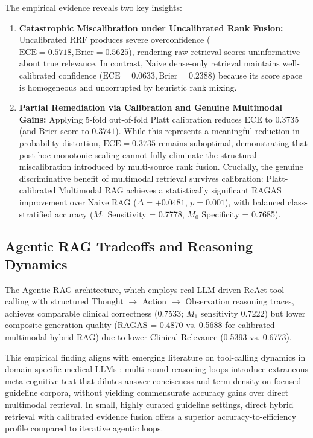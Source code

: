 The empirical evidence reveals two key insights:
\begin{enumerate}
    \item \textbf{Catastrophic Miscalibration under Uncalibrated Rank Fusion:} Uncalibrated RRF produces severe overconfidence ($\text{ECE} = 0.5718, \text{Brier} = 0.5625$), rendering raw retrieval scores uninformative about true relevance. In contrast, Naive dense-only retrieval maintains well-calibrated confidence ($\text{ECE} = 0.0633, \text{Brier} = 0.2388$) because its score space is homogeneous and uncorrupted by heuristic rank mixing.
    \item \textbf{Partial Remediation via Calibration and Genuine Multimodal Gains:} Applying 5-fold out-of-fold Platt calibration reduces ECE to $0.3735$ (and Brier score to $0.3741$). While this represents a meaningful reduction in probability distortion, $\text{ECE} = 0.3735$ remains suboptimal, demonstrating that post-hoc monotonic scaling cannot fully eliminate the structural miscalibration introduced by multi-source rank fusion. Crucially, the genuine discriminative benefit of multimodal retrieval survives calibration: Platt-calibrated Multimodal RAG achieves a statistically significant RAGAS improvement over Naive RAG ($\Delta = +0.0481$, $p = 0.001$), with balanced class-stratified accuracy ($M_1$ Sensitivity = 0.7778, $M_0$ Specificity = 0.7685).
\end{enumerate}

\subsection{Agentic RAG Tradeoffs and Reasoning Dynamics}

The Agentic RAG architecture, which employs real LLM-driven ReAct tool-calling with structured Thought $\to$ Action $\to$ Observation reasoning traces, achieves comparable clinical correctness (0.7533; $M_1$ sensitivity 0.7222) but lower composite generation quality (RAGAS = 0.4870 vs. 0.5688 for calibrated multimodal hybrid RAG) due to lower Clinical Relevance (0.5393 vs. 0.6773). 

This empirical finding aligns with emerging literature on tool-calling dynamics in domain-specific medical LLMs \cite{singh2025agentic}: multi-round reasoning loops introduce extraneous meta-cognitive text that dilutes answer conciseness and term density on focused guideline corpora, without yielding commensurate accuracy gains over direct multimodal retrieval. In small, highly curated guideline settings, direct hybrid retrieval with calibrated evidence fusion offers a superior accuracy-to-efficiency profile compared to iterative agentic loops.

